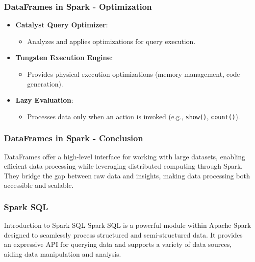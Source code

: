 \documentclass[aspectratio=169]{beamer}
\begin{document}
\begin{frame}[fragile]
    \frametitle{DataFrames in Spark - Optimization}
    \begin{itemize}
        \item \textbf{Catalyst Query Optimizer}:
            \begin{itemize}
                \item Analyzes and applies optimizations for query execution.
            \end{itemize}
        
        \item \textbf{Tungsten Execution Engine}:
            \begin{itemize}
                \item Provides physical execution optimizations (memory management, code generation).
            \end{itemize}
        
        \item \textbf{Lazy Evaluation}:
            \begin{itemize}
                \item Processes data only when an action is invoked (e.g., \texttt{show()}, \texttt{count()}).
            \end{itemize}
    \end{itemize}
\end{frame}

\begin{frame}[fragile]
    \frametitle{DataFrames in Spark - Conclusion}
    DataFrames offer a high-level interface for working with large datasets, enabling efficient data processing while leveraging distributed computing through Spark. They bridge the gap between raw data and insights, making data processing both accessible and scalable.
\end{frame}

\begin{frame}
    \frametitle{Spark SQL}
    \begin{block}{Introduction to Spark SQL}
        Spark SQL is a powerful module within Apache Spark designed to seamlessly process structured and semi-structured data. It provides an expressive API for querying data and supports a variety of data sources, aiding data manipulation and analysis.
    \end{block}
\end{frame}
\end{document}
